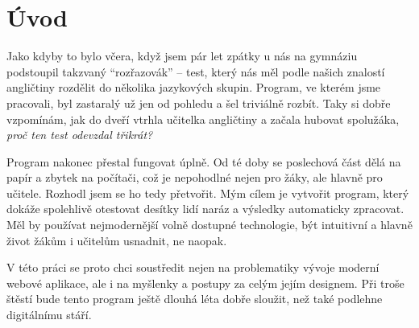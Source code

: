 \chapter*{Úvod}

Jako kdyby to bylo včera, když jsem pár let zpátky u nás na gymnáziu podstoupil takzvaný \enquote{rozřazovák} -- test, který nás měl podle našich znalostí angličtiny rozdělit do několika jazykových skupin. Program, ve kterém jsme pracovali, byl zastaralý už jen od pohledu a šel triviálně rozbít. Taky si dobře vzpomínám, jak do dveří vtrhla učitelka angličtiny a začala hubovat spolužáka, \textit{proč ten test odevzdal třikrát?}

Program nakonec přestal fungovat úplně. Od té doby se poslechová část dělá na papír a zbytek na počítači, což je nepohodlné nejen pro žáky, ale hlavně pro učitele. Rozhodl jsem se ho tedy přetvořit. Mým cílem je vytvořit program, který dokáže spolehlivě otestovat desítky lidí naráz a výsledky automaticky zpracovat. Měl by používat nejmodernější volně dostupné technologie, být intuitivní a hlavně život žákům i učitelům usnadnit, ne naopak.

V této práci se proto chci soustředit nejen na problematiky vývoje moderní webové aplikace, ale i na myšlenky a postupy za celým jejím designem. Při troše štěstí bude tento program ještě dlouhá léta dobře sloužit, než také podlehne digitálnímu stáří.